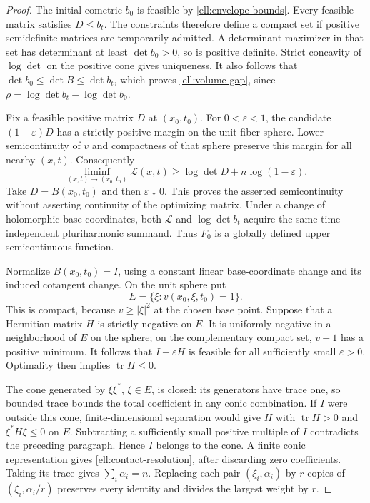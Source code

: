 \documentclass[11pt]{article}
\theoremstyle{definition}
\theoremstyle{remark}
\DeclareMathOperator{\tr}{tr}
\numberwithin{equation}{section}
\begin{document}
\begin{proof}
The initial cometric $b_0$ is feasible by
\eqref{ell:envelope-bounds}.  Every feasible matrix satisfies $D\le b_t$.
The constraints therefore define a compact set if positive semidefinite
matrices are temporarily admitted.  A determinant maximizer in that set
has determinant at least $\det b_0>0$, so is positive definite.
Strict concavity of $\log\det$ on the positive cone gives uniqueness.
It also follows that $\det b_0\le\det B\le\det b_t$, which proves
\eqref{ell:volume-gap}, since
$\rho=\log\det b_t-\log\det b_0$.

Fix a feasible positive matrix $D$ at $(x_0,t_0)$.  For $0<\varepsilon<1$,
the candidate $(1-\varepsilon)D$ has a strictly positive margin on the
unit fiber sphere.  Lower semicontinuity of $v$ and compactness of that
sphere preserve this margin for all nearby $(x,t)$.  Consequently
\[
 \liminf_{(x,t)\to(x_0,t_0)}\mathcal L(x,t)
 \ge\log\det D+n\log(1-\varepsilon).
\]
Take $D=B(x_0,t_0)$ and then $\varepsilon\downarrow0$.
This proves the asserted semicontinuity without asserting continuity of
the optimizing matrix.  Under a change of holomorphic base coordinates,
both $\mathcal L$ and $\log\det b_t$ acquire the same time-independent
pluriharmonic summand.  Thus $F_0$ is a globally defined upper
semicontinuous function.

Normalize $B(x_0,t_0)=I$, using a constant linear base-coordinate change
and its induced cotangent change.  On the unit sphere put
\[
 E=\{\xi:v(x_0,\xi,t_0)=1\}.
\]
This is compact, because $v\ge|\xi|^2$ at the chosen base point.
Suppose that a Hermitian matrix $H$ is strictly negative on $E$.
It is uniformly negative in a neighborhood of $E$ on the sphere;
on the complementary compact set, $v-1$ has a positive minimum.
It follows that $I+\varepsilon H$ is feasible for all sufficiently
small $\varepsilon>0$.  Optimality then implies $\tr H\le0$.

The cone generated by $\xi\xi^*$, $\xi\in E$, is closed: its generators
have trace one, so bounded trace bounds the total coefficient in any
conic combination.  If $I$ were outside this cone, finite-dimensional
separation would give $H$ with $\tr H>0$ and $\xi^*H\xi\le0$ on $E$.
Subtracting a sufficiently small positive multiple of $I$ contradicts
the preceding paragraph.  Hence $I$ belongs to the cone.  A finite
conic representation gives \eqref{ell:contact-resolution}, after
discarding zero coefficients.  Taking its trace gives $\sum_i\alpha_i=n$.
Replacing each pair $(\xi_i,\alpha_i)$ by $r$ copies of
$(\xi_i,\alpha_i/r)$ preserves every identity and divides the largest
weight by $r$.
\end{proof}
\end{document}
